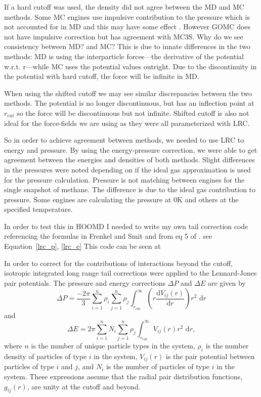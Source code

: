 If a hard cutoff was used, the density did not agree between the MD and MC methods.
Some MC engines use impulsive contribution to the pressure which is not accounted for in MD and this may have some effect \citep{frenkel2001understanding}.
However GOMC does not have impulsive correction but has agreement with MC3S. Why do we see consistency between MD? and MC?
This is due to innate differences in the two methods: MD is using the interparticle forces---the derivative of the potential w.r.t. r---while MC uses the potential values outright.
Due to the discontinuity in the potential with hard cutoff, the force will be infinite in MD.

When using the shifted cutoff we may see similar discrepancies between the two methods. 
The potential is no longer discontinuous, but has an inflection point at $r_{cut}$ so the force will be discontinuous but not infinite.
Shifted cutoff is also not ideal for the force-fields we are using as they were all parameterized with LRC. 

So in order to achieve agreement between methods, we needed to use LRC to energy and pressure. 
By using the energy-pressure correction, we were able to get agreement between the energies and densities of both methods. 
Slight differences in the pressures were noted depending on if the ideal gas approximation is used for the pressure calculation.
Pressure is not matching between engines for the single snapshot of methane. 
The difference is due to the ideal gas contribution to pressure. 
Some engines are calculating the pressure at 0K and others at the specified temperature.

In order to test this in HOOMD I needed to write my own tail correction code referencing the formulas in Frenkel and Smit  \citep{frenkel2001understanding} and from eq 5 of  \citep{Sun1998}. see Equation~\eqref{lrc_p}, \eqref{lrc_e}
This code can be seen at %

In order to correct for the contributions of interactions beyond the cutoff, isotropic integrated long range tail corrections were applied to the Lennard-Jones pair potentials. The pressure and energy corrections $\Delta P$ and $\Delta E$ are given by
\begin{equation}\label{lrc_p}
    \Delta P = \frac{-2\pi}{3} \sum_{i=1}^{n} \rho_i \sum_{j=1}^{n} \rho_j
    \int_{r_\mathrm{cut}}^{\infty} \left( r
    \frac{\mathrm{d}V_{ij}(r)}{\mathrm{d}r} \right) r^2 \,\,\mathrm{d}r  
\end{equation}
and
\begin{equation}\label{lrc_e}
    \Delta E = 2\pi \sum_{i=1}^{n} N_i \sum_{j=1}^{n} \rho_j
    \int_{r_\mathrm{cut}}^{\infty} V_{ij}(r) r^2\,\,\mathrm{d}r, 
\end{equation}
where $n$ is the number of unique particle types in the system, $\rho_{i}$ is the number density of particles of type $i$ in the system, $V_{ij}(r)$ is the pair potential between particles of type $i$ and $j$, and $N_{i}$ is the number of particles of type $i$ in the system. These expressions assume that the radial pair distribution functions, $g_{ij}(r)$, are unity at the cutoff and beyond.


